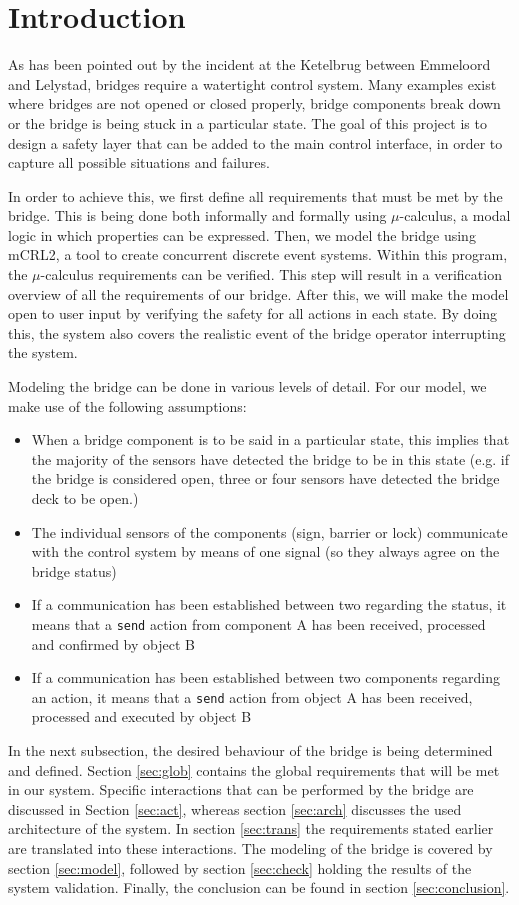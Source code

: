 \section{Introduction}

As has been pointed out by the incident at the Ketelbrug between Emmeloord and Lelystad, bridges require a watertight control system.  Many examples exist where bridges are not opened or closed properly, bridge components break down or the bridge is being stuck in a particular state. The goal of this project is to design a safety layer that can be added to the main control interface, in order to capture all possible situations and failures.

In order to achieve this, we first define all requirements that must be met by the bridge. This is being done both informally and formally using $\mu$-calculus, a modal logic in which properties can be expressed. Then, we model the bridge using mCRL2, a tool to create concurrent discrete event systems. Within this program, the $\mu$-calculus requirements can be verified. This step will result in a verification overview of all the requirements of our bridge. After this, we will make the model open to user input by verifying the safety for all actions in each state. By doing this, the system also covers the realistic event of the bridge operator interrupting the system.

Modeling the bridge can be done in various levels of detail. For our model, we make use of the following assumptions:
%
\begin{itemize}
	\item When a bridge component is to be said in a particular state, this implies that the majority of the sensors have detected the bridge to be in this state (e.g. if the bridge is considered open, three or four sensors have detected the bridge deck to be open.)
	\item	The individual sensors of the components (sign, barrier or lock) communicate with the control system by means of one signal (so they always agree on the bridge status)
	\item If a communication has been established between two regarding the status, it means that a \texttt{send} action from component A has been received, processed and confirmed by object B
	\item If a communication has been established between two components regarding an action, it means that a \texttt{send} action from object A has been received, processed and executed by object B
\end{itemize}
%
In the next subsection, the desired behaviour of the bridge is being determined and defined. Section \ref{sec:glob} contains the global requirements that will be met in our system. Specific interactions that can be performed by the bridge are discussed in Section \ref{sec:act}, whereas section \ref{sec:arch} discusses the used architecture of the system. In section \ref{sec:trans} the requirements stated earlier are translated into these interactions. The modeling of the bridge is covered by section \ref{sec:model}, followed by section \ref{sec:check} holding the results of the system validation. Finally, the conclusion can be found in section \ref{sec:conclusion}.

